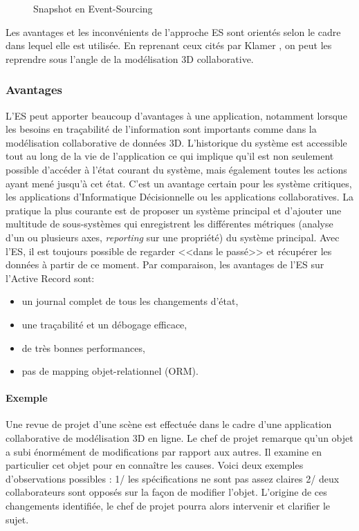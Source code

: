	
	\begin{figure}[t]
		\centering
		
		\caption{Snapshot en Event-Sourcing}
	\end{figure}

Les avantages et les inconvénients de l'approche \gls{ES} sont orientés selon le 
cadre dans lequel elle est utilisée. En reprenant ceux cités par Klamer 
\cite{Klamer2013a}, on peut les reprendre sous l'angle de la modélisation 3D 
collaborative.

\subsubsection{Avantages}
L'\gls{ES} peut apporter beaucoup d'avantages à une application, notamment 
lorsque les besoins en traçabilité de l'information sont importants comme dans 
la modélisation collaborative de données 3D.
L'historique du système est accessible tout au long de la vie de l'application ce 
qui implique qu'il est non seulement possible d'accéder à l'état courant du 
système, mais également toutes les actions ayant mené jusqu'à cet état. C'est 
un avantage certain pour les système critiques, les applications d'Informatique 
Décisionnelle ou les applications collaboratives. La pratique la plus 
courante est de proposer un système principal et d'ajouter une multitude de 
sous-systèmes qui enregistrent les différentes métriques (analyse d'un ou 
plusieurs axes, \textit{reporting} sur une propriété) du système principal. Avec 
l'\gls{ES}, il est toujours possible de regarder <<dans le passé>> et récupérer 
les données à partir de ce moment. Par comparaison, les avantages de 
l'\gls{ES} sur l'Active Record sont:
\begin{itemize}
	\item un journal complet de tous les changements d'état,
	\item une traçabilité et un débogage efficace,
	\item de très bonnes performances,
	\item pas de mapping objet-relationnel (ORM).
\end{itemize}

	
\paragraph{Exemple} 
Une revue de projet d'une scène est effectuée dans le cadre d'une application 
collaborative de modélisation 3D en ligne. Le chef de projet remarque qu'un 
objet a subi énormément de modifications par rapport aux autres. Il examine en 
particulier cet objet pour en connaître les causes. Voici deux exemples 
d'observations possibles : 1/ les spécifications ne sont pas assez claires 2/ 
deux collaborateurs sont opposés sur la façon de modifier l'objet. L'origine de 
ces changements identifiée, le chef de projet pourra alors intervenir et clarifier 
le sujet. 

